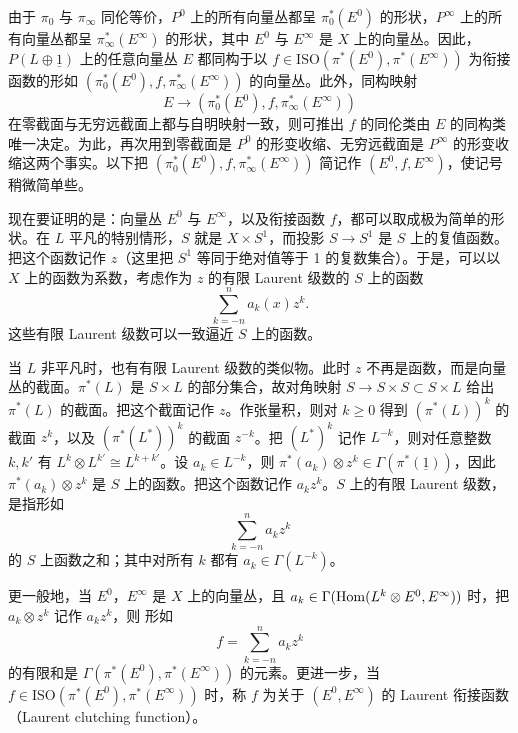 由于 $\pi_0$ 与 $\pi_\infty$ 同伦等价，$P^0$ 上的所有向量丛都呈 $\pi_0^{*}(E^0)$ 的形状，$P^\infty$ 上的所有向量丛都呈 $\pi_\infty^{*}(E^\infty)$ 的形状，其中 $E^0$ 与 $E^\infty$ 是 $X$ 上的向量丛。因此，$P(L\oplus\underline{1})$ 上的任意向量丛 $E$ 都同构于以 $f\in\mathrm{ISO}(\pi^{*}(E^0),\pi^{*}(E^\infty))$ 为衔接函数的形如 $(\pi_0^{*}(E^0),f,\pi_\infty^{*}(E^\infty))$ 的向量丛。此外，同构映射
\[
E\longrightarrow(\pi_0^{*}(E^0),f,\pi_\infty^{*}(E^\infty))
\]
在零截面与无穷远截面上都与自明映射一致，则可推出 $f$ 的同伦类由 $E$ 的同构类唯一决定。为此，再次用到零截面是 $P^0$ 的形变收缩、无穷远截面是 $P^\infty$ 的形变收缩这两个事实。以下把 $(\pi_0^{*}(E^0),f,\pi_\infty^{*}(E^\infty))$ 简记作 $(E^0,f,E^\infty)$，使记号稍微简单些。

现在要证明的是：向量丛 $E^0$ 与 $E^\infty$，以及衔接函数 $f$，都可以取成极为简单的形状。在 $L$ 平凡的特别情形，$S$ 就是 $X\times S^1$，而投影 $S\to S^1$ 是 $S$ 上的复值函数。把这个函数记作 $z$（这里把 $S^1$ 等同于绝对值等于 1 的复数集合）。于是，可以以 $X$ 上的函数为系数，考虑作为 $z$ 的有限 Laurent 级数的 $S$ 上的函数
\[
\sum_{k=-n}^{n}a_k(x)z^k.
\]
这些有限 Laurent 级数可以一致逼近 $S$ 上的函数。

当 $L$ 非平凡时，也有有限 Laurent 级数的类似物。此时 $z$ 不再是函数，而是向量丛的截面。$\pi^{*}(L)$ 是 $S\times L$ 的部分集合，故对角映射 $S\to S\times S\subset S\times L$ 给出 $\pi^{*}(L)$ 的截面。把这个截面记作 $z$。作张量积，则对 $k\ge0$ 得到 $(\pi^{*}(L))^k$ 的截面 $z^k$，以及 $(\pi^{*}(L^{*}))^k$ 的截面 $z^{-k}$。把 $(L^{*})^k$ 记作 $L^{-k}$，则对任意整数 $k,k'$ 有 $L^k\otimes L^{k'}\cong L^{k+k'}$。设 $a_k\in L^{-k}$，则 $\pi^{*}(a_k)\otimes z^k\in\Gamma(\pi^{*}(\underline{1}))$，因此 $\pi^{*}(a_k)\otimes z^k$ 是 $S$ 上的函数。把这个函数记作 $a_kz^k$。$S$ 上的有限 Laurent 级数，是指形如
\[
\sum_{k=-n}^{n}a_kz^k
\]
的 $S$ 上函数之和；其中对所有 $k$ 都有 $a_k\in\Gamma(L^{-k})$。

更一般地，当 $E^0$，$E^\infty$ 是 $X$ 上的向量丛，且 $a_k\in\Gamma(\operatorname{Hom}(L^k\otimes E^0,E^\infty))$ 时，把 $a_k\otimes z^k$ 记作 $a_kz^k$，则
形如
\[
f=\sum_{k=-n}^{n}a_kz^k
\]
的有限和是 $\Gamma(\pi^{*}(E^0),\pi^{*}(E^\infty))$ 的元素。更进一步，当 $f\in\mathrm{ISO}(\pi^{*}(E^0),\pi^{*}(E^\infty))$ 时，称 $f$ 为关于 $(E^0,E^\infty)$ 的 Laurent 衔接函数（Laurent clutching function）。

